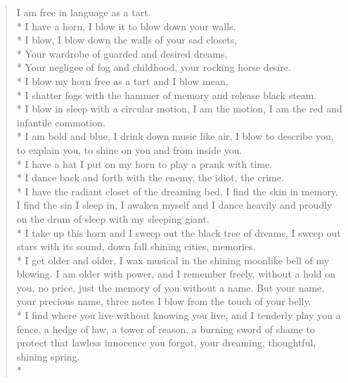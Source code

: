 \documentclass[english,11pt,letterpaper,onecolumn]{scrbook}
\begin{document}
\begin{verse}
I am free in language as a tart.  \\*
I have a horn, I blow it to blow down your walls.  \\*
I blow, I blow down the walls of your sad closets,  \\*
Your wardrobe of guarded and desired dreams,  \\*
Your negligee of fog and childhood, your rocking horse desire.  \\*
I blow my horn free as a tart and I blow mean,  \\*
I shatter fogs with the hammer of memory and release black steam.  \\*
I blow in sleep with a circular motion, I am the motion, I am the red and infantile commotion.  \\*
I am bold and blue, I drink down music like air, I blow to describe you, to explain you, to shine on you and from inside you.  \\*
I have a hat I put on my horn to play a prank with time.  \\*
I dance back and forth with the enemy, the idiot, the crime.  \\*
I have the radiant closet of the dreaming bed, I find the skin in memory, I find the sin I sleep in, I awaken myself and I dance heavily and proudly on the drum of sleep with my sleeping giant.  \\*
I take up this horn and I sweep out the black tree of dreams, I sweep out stars with its sound, down fall shining cities, memories.  \\*
I get older and older, I wax musical in the shining moonlike bell of my blowing.  I am older with power, and I remember freely, without a hold on you, no price, just the memory of you without a name.  But your name, your precious name, three notes I blow from the touch of your belly.  \\*
I find where you live without knowing you live, and I tenderly play you a fence, a hedge of law, a tower of reason, a burning sword of shame to protect that lawless innocence you forgot, your dreaming, thoughtful, shining spring.\\*
\end{verse}

\newpage
{}
\end{document}
